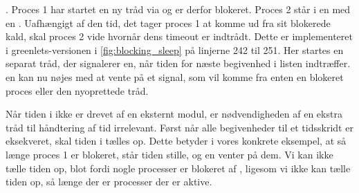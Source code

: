 . Proces 1 har startet en ny tråd via  og er derfor blokeret. Proces 2 står i en  med en . Uafhængigt af den tid, det tager proces 1 at komme ud fra sit blokerede kald, skal proces 2 vide hvornår dens timeout er indtrådt. Dette er implementeret i greenlets-versionen i \cref{fig:blocking_sleep} på linjerne 242 til 251. Her startes en separat tråd, der signalerer \sched en, når tiden for næste begivenhed i  listen indtræffer. \Sched en kan nu nøjes med at vente på et signal, som vil komme fra enten en blokeret proces eller den nyoprettede tråd.

Når tiden i \des ikke er drevet af en eksternt modul, er nødvendigheden af en ekstra tråd til  håndtering af tid irrelevant. Først når alle begivenheder til et tidsskridt er eksekveret, skal tiden i \des tælles op. Dette betyder i vores konkrete eksempel, at  så længe proces 1 er blokeret, står tiden stille, og  \sched en venter på dem. Vi kan ikke tælle tiden op, blot fordi nogle processer er blokeret af , ligesom vi ikke kan tælle tiden op, så længe der er processer der er aktive. %

